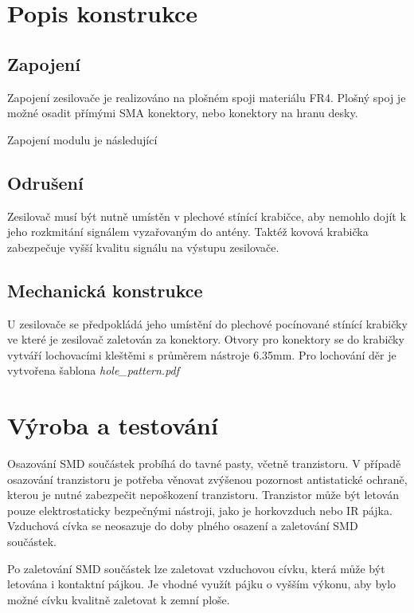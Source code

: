 \documentclass[12pt,a4paper,oneside]{article}
\begin{document}
\section{Popis konstrukce}

\subsection{Zapojení}

Zapojení zesilovače je realizováno na plošném spoji materiálu FR4. Plošný spoj je možné osadit přímými SMA konektory, nebo konektory na hranu desky. 

Zapojení modulu je následující




\subsection{Odrušení}

Zesilovač musí být nutně umístěn v plechové stínící krabičce, aby nemohlo dojít k jeho rozkmitání signálem vyzařovaným do antény. Taktéž kovová krabička zabezpečuje vyšší kvalitu signálu na výstupu zesilovače. 

\subsection{Mechanická konstrukce}

U zesilovače se předpokládá jeho umístění do plechové pocínované stínící krabičky ve které je zesilovač zaletován za konektory. 
Otvory pro konektory se do krabičky vytváří lochovacími kleštěmi s průměrem nástroje 6.35mm.  Pro lochování děr je vytvořena šablona \textit{hole\_pattern.pdf}

\section{Výroba a testování}

Osazování SMD součástek probíhá do tavné pasty, včetně tranzistoru. V případě osazování tranzistoru je potřeba věnovat zvýšenou pozornost antistatické ochraně, kterou je nutné zabezpečit nepoškození tranzistoru. Tranzistor může být letován pouze elektrostaticky bezpečnými nástroji, jako je horkovzduch nebo IR pájka. 
Vzduchová cívka se neosazuje do doby plného osazení a zaletování SMD součástek. 

Po zaletování SMD součástek lze zaletovat vzduchovou cívku, která může být letována i kontaktní pájkou. Je vhodné využít pájku o vyšším výkonu, aby bylo možné cívku kvalitně zaletovat k zemní ploše. 
\end{document}
